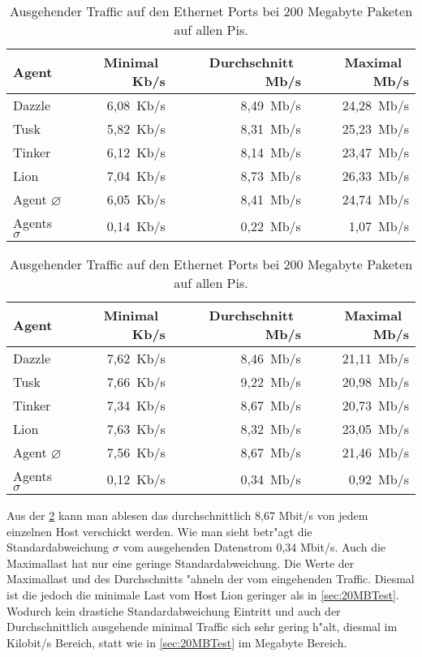\begin{table}
\centering
\begin{tabular}{l%
 r<{\,Kb/s}%
 r<{\,Mb/s}%
 r<{\,Mb/s}%
}
Agent  				& Minimal		& Durchschnitt		& Maximal	\\
\hline
Dazzle 				& 6,08			& 8,49 			& 24,28		\\
Tusk 				& 5,82			& 8,31			& 25,23		\\
Tinker				& 6,12			& 8,14			& 23,47		\\
Lion				& 7,04			& 8,73			& 26,33		\\ 
Agent $\diameter $	 	& 6,05			& 8,41			& 24,74		\\   
Agents $\sigma $		& 0,14			& 0,22			& 1,07		\\

\end{tabular}
\caption{Eingehender Traffic auf den Ethernet Ports bei 200 Megabyte Paketen auf allen Pis.}
\label{tab:EingehenderTraffic200Mb}
\begin{tabular}{l%
 r<{\,Kb/s}%
 r<{\,Mb/s}%
 r<{\,Mb/s}%
}
Agent  				& Minimal		& Durchschnitt		& Maximal	\\	
\hline
Dazzle 				& 7,62			& 8,46	 		& 21,11		\\
Tusk 				& 7,66			& 9,22			& 20,98		\\
Tinker				& 7,34			& 8,67			& 20,73		\\
Lion				& 7,63			& 8,32			& 23,05		\\ 
Agent $\diameter $	 	& 7,56			& 8,67			& 21,46		\\   
Agents $\sigma $		& 0,12			& 0,34			& 0,92		\\

\end{tabular}
\caption{Ausgehender Traffic auf den Ethernet Ports bei 200 Megabyte Paketen auf allen Pis.}
\label{tab:AusgehenderTraffic200Mb}

\end{table}

Aus der \cref{tab:AusgehenderTraffic200Mb} kann man ablesen das durchschnittlich %
8,67 Mbit/s von jedem einzelnen Host verschickt werden. Wie man sieht betr"agt die Standardabweichung %
$\sigma$ vom ausgehenden Datenstrom 0,34 Mbit/s. Auch die Maximallast hat nur eine geringe Standardabweichung. %
Die Werte der Maximallast und des Durchschnitts "ahneln der vom eingehenden Traffic. %
Diesmal ist die jedoch die minimale Last vom Host Lion geringer als in \cref{sec:20MBTest}. %
Wodurch kein drastiche Standardabweichung Eintritt und auch der Durchschnittlich ausgehende %
minimal Traffic sich sehr gering h"alt, diesmal im Kilobit/s Bereich, statt wie in \cref{sec:20MBTest} %
im Megabyte Bereich. %


